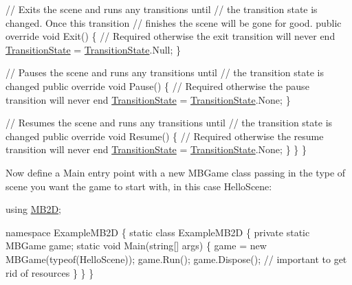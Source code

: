 \begin{DoxyCode}
    \textcolor{comment}{// Exits the scene and runs any transitions until}
    \textcolor{comment}{// the transition state is changed. Once this transition}
    \textcolor{comment}{// finishes the scene will be gone for good.}
    \textcolor{keyword}{public} \textcolor{keyword}{override} \textcolor{keywordtype}{void} Exit()
    \{
      \textcolor{comment}{// Required otherwise the exit transition will never end}
      \hyperlink{namespace_m_b2_d_1_1_scenes_a0e0db3f97bbaa272f70534c5954c4acc}{TransitionState} = \hyperlink{namespace_m_b2_d_1_1_scenes_a0e0db3f97bbaa272f70534c5954c4acc}{TransitionState}.Null;
    \}

    \textcolor{comment}{// Pauses the scene and runs any transitions until}
    \textcolor{comment}{// the transition state is changed}
    \textcolor{keyword}{public} \textcolor{keyword}{override} \textcolor{keywordtype}{void} Pause()
    \{
      \textcolor{comment}{// Required otherwise the pause transition will never end}
      \hyperlink{namespace_m_b2_d_1_1_scenes_a0e0db3f97bbaa272f70534c5954c4acc}{TransitionState} = \hyperlink{namespace_m_b2_d_1_1_scenes_a0e0db3f97bbaa272f70534c5954c4acc}{TransitionState}.None;
    \}

    \textcolor{comment}{// Resumes the scene and runs any transitions until}
    \textcolor{comment}{// the transition state is changed}
    \textcolor{keyword}{public} \textcolor{keyword}{override} \textcolor{keywordtype}{void} Resume()
    \{
      \textcolor{comment}{// Required otherwise the resume transition will never end}
      \hyperlink{namespace_m_b2_d_1_1_scenes_a0e0db3f97bbaa272f70534c5954c4acc}{TransitionState} = \hyperlink{namespace_m_b2_d_1_1_scenes_a0e0db3f97bbaa272f70534c5954c4acc}{TransitionState}.None;
    \}
  \}
\}
\end{DoxyCode}


Now define a Main entry point with a new {\ttfamily M\+B\+Game} class passing in the type of scene you want the game to start with, in this case {\ttfamily Hello\+Scene}\+:


\begin{DoxyCode}
\textcolor{keyword}{using} \hyperlink{namespace_m_b2_d}{MB2D};

\textcolor{keyword}{namespace }ExampleMB2D
\{
  \textcolor{keyword}{static} \textcolor{keyword}{class }ExampleMB2D
  \{
    \textcolor{keyword}{private} \textcolor{keyword}{static} MBGame game;
    \textcolor{keyword}{static} \textcolor{keywordtype}{void} Main(\textcolor{keywordtype}{string}[] args)
    \{
      game = \textcolor{keyword}{new} MBGame(typeof(HelloScene));
      game.Run();
      game.Dispose(); \textcolor{comment}{// important to get rid of resources}
    \}
  \}
\}
\end{DoxyCode}


